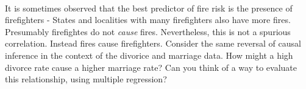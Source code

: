 \documentclass[12pt]{article}\usepackage[]{graphicx}\usepackage[]{color}
\newenvironment{problem}[2][Problem]{\begin{trivlist}
\item[\hskip \labelsep {\bfseries #1}\hskip \labelsep {\bfseries #2.}]}{\end{trivlist}}
\begin{document}
\begin{problem}{5M3}
\text{ }\\
It is sometimes observed that the best predictor of fire risk is the presence of firefighters - States and localities with many firefighters also have more fires. Presumably firefightes do not \textit{cause} fires. Nevertheless, this is not a spurious correlation. Instead fires cause firefighters. Consider the same reversal of causal inference in the context of the divorice and marriage data. How might a high divorce rate cause a higher marriage rate? Can you think of a way to evaluate this relationship, using multiple regression?
\end{problem}
\end{document}
